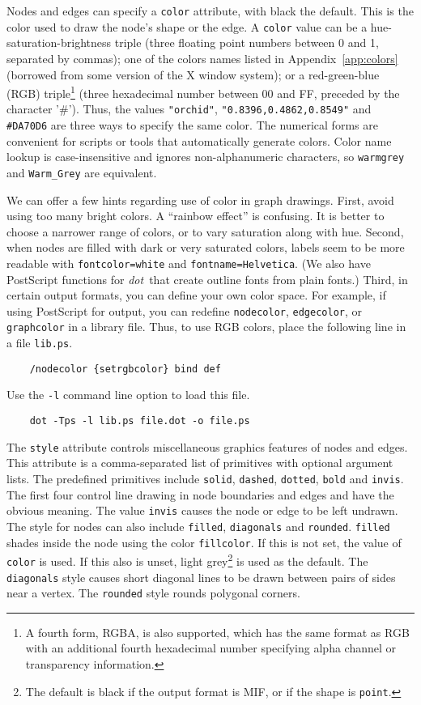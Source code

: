 \documentclass[11pt]{article}
\def\dot{{\it dot}}
\begin{document}
Nodes and edges can specify a {\tt color} attribute, with black
the default. This is the color used to draw the node's shape
or the edge. A {\tt color} value can be a hue-saturation-brightness triple
(three floating point numbers between 0 and 1, separated by commas);
one of the colors names listed in Appendix~\ref{app:colors}
(borrowed from some version of the X window system); or
a red-green-blue (RGB) triple\footnote{A fourth form, RGBA, is also supported,
which has the same format as RGB with an additional fourth hexadecimal 
number specifying alpha channel or transparency information.}
(three hexadecimal number between 00 and FF, preceded by the character '\#').
Thus, the values {\tt "orchid"}, {\tt "0.8396,0.4862,0.8549"} and
{\tt \#DA70D6} are three ways to specify the same color.
The numerical forms are convenient for scripts or tools that
automatically generate colors.
Color name lookup is case-insensitive and ignores non-alphanumeric
characters, so \verb'warmgrey' and \verb'Warm_Grey' are equivalent.

We can offer a few hints regarding use of color in graph drawings.
First, avoid using too many bright colors.
A ``rainbow effect'' is confusing.
It is better to choose a narrower range of colors, or
to vary saturation along with hue.
Second, when nodes are filled with dark or very saturated
colors, labels seem to be more readable with \verb"fontcolor=white"
and \verb"fontname=Helvetica".  (We also have PostScript functions
for \dot\ that create outline fonts from plain fonts.)
Third, in certain output formats, you can define your own color space.
For example, if using PostScript for output, you can redefine
\verb"nodecolor", \verb"edgecolor", or \verb"graphcolor"
in a library file.  Thus, to use RGB colors, place
the following line in a file \verb"lib.ps".
\begin{verbatim}
    /nodecolor {setrgbcolor} bind def
\end{verbatim}
Use the \verb"-l" command line option to load this file.
\begin{verbatim}
    dot -Tps -l lib.ps file.dot -o file.ps
\end{verbatim}

The {\tt style} attribute controls miscellaneous graphics features of 
nodes and edges.
This attribute is a comma-separated list of primitives with 
optional argument lists.
The predefined primitives include \verb"solid", \verb"dashed", \verb"dotted",
\verb"bold" and \verb"invis".
The first four control line drawing in node boundaries and edges and
have the obvious meaning. The value {\tt invis} causes the node or edge
to be left undrawn.
The style for nodes can also include \verb"filled", 
\verb"diagonals" and \verb"rounded".
\verb"filled" shades inside the node
using the color {\tt fillcolor}. If this is not set, the value of
{\tt color} is used. If this also is unset,
light grey\footnote{The default is black if the output format is MIF,
or if the shape is {\tt point}.} is used as the default.
The \verb"diagonals" style causes short diagonal lines to be drawn
between pairs of sides near a vertex. The \verb"rounded" style rounds 
polygonal corners.
\end{document}
